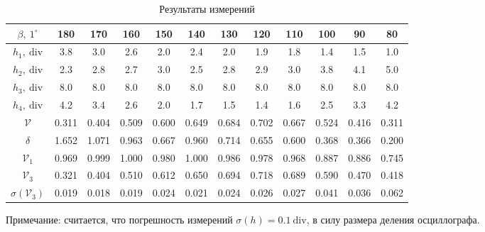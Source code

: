 \documentclass[12pt, a4paper]{article}
\newcommand{\V}{\mathcal{V}}
\begin{document}
\begin{table}[H]
    \centering
    \caption{Результаты измерений}
    \begin{tabular}{|c|c|c|c|c|c|c|c|c|c|c|c|}
        \hline
        $\beta,~1^\circ$    & 180   & 170   & 160   & 150   & 140   & 130   & 120   & 110   & 100   & 90    & 80    \\ \hline
        $h_1,~\mathrm{div}$ & 3.8   & 3.0   & 2.6   & 2.0   & 2.4   & 2.0   & 1.9   & 1.8   & 1.4   & 1.5   & 1.0   \\ \hline
        $h_2,~\mathrm{div}$ & 2.3   & 2.8   & 2.7   & 3.0   & 2.5   & 2.8   & 2.9   & 3.0   & 3.8   & 4.1   & 5.0   \\ \hline
        $h_3,~\mathrm{div}$ & 8.0   & 8.0   & 8.0   & 8.0   & 8.0   & 8.0   & 8.0   & 8.0   & 8.0   & 8.0   & 8.0   \\ \hline
        $h_4,~\mathrm{div}$ & 4.2   & 3.4   & 2.6   & 2.0   & 1.7   & 1.5   & 1.4   & 1.6   & 2.5   & 3.3   & 4.2   \\ \hline
        $\V$                & 0.311 & 0.404 & 0.509 & 0.600 & 0.649 & 0.684 & 0.702 & 0.667 & 0.524 & 0.416 & 0.311 \\ \hline
        $\delta$            & 1.652 & 1.071 & 0.963 & 0.667 & 0.960 & 0.714 & 0.655 & 0.600 & 0.368 & 0.366 & 0.200 \\ \hline
        $\V_1$              & 0.969 & 0.999 & 1.000 & 0.980 & 1.000 & 0.986 & 0.978 & 0.968 & 0.887 & 0.886 & 0.745 \\ \hline
        $\V_3$              & 0.321 & 0.404 & 0.510 & 0.612 & 0.650 & 0.694 & 0.718 & 0.689 & 0.590 & 0.470 & 0.418 \\ \hline
        $\sigma(\V_3)$      & 0.019 & 0.018 & 0.019 & 0.024 & 0.021 & 0.024 & 0.026 & 0.027 & 0.041 & 0.036 & 0.062 \\ \hline
    \end{tabular}
    \label{tab:results}
\end{table}
Примечание: считается, что погрешность измерений $\sigma(h) = 0.1~\mathrm{div}$, в силу размера деления осциллографа.
\end{document}
